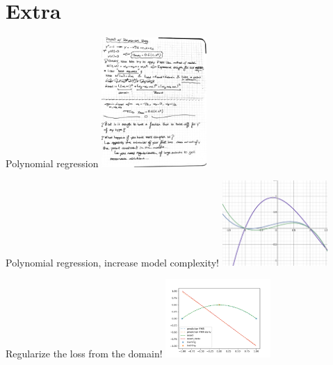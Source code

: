 \documentclass[aspectratio=169]{beamer}
\begin{document}
\section{Extra}
\begin{frame}{Polynomial regression}
  \centering
    \includegraphics[width=0.3\textwidth]{pinnpoly.pdf}
\end{frame}

\begin{frame}{Polynomial regression, increase model complexity!}
  \centering
    \includegraphics[width=0.3\textwidth]{models.png}
\end{frame}

\begin{frame}{Regularize the loss from the domain!}
  \centering
    \includegraphics[width=0.3\textwidth]{pinn-3.pdf}
\end{frame}
\end{document}
